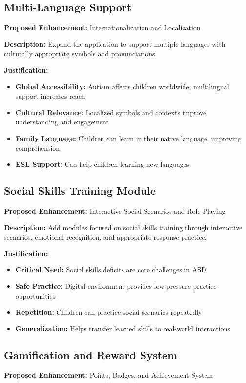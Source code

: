 \documentclass[12pt,a4paper]{article}
\begin{document}
\subsection{Multi-Language Support}
\textbf{Proposed Enhancement:} Internationalization and Localization

\textbf{Description:}
Expand the application to support multiple languages with culturally appropriate symbols and pronunciations.

\textbf{Justification:}
\begin{itemize}
    \item \textbf{Global Accessibility:} Autism affects children worldwide; multilingual support increases reach
    \item \textbf{Cultural Relevance:} Localized symbols and contexts improve understanding and engagement
    \item \textbf{Family Language:} Children can learn in their native language, improving comprehension
    \item \textbf{ESL Support:} Can help children learning new languages
\end{itemize}

\subsection{Social Skills Training Module}
\textbf{Proposed Enhancement:} Interactive Social Scenarios and Role-Playing

\textbf{Description:}
Add modules focused on social skills training through interactive scenarios, emotional recognition, and appropriate response practice.

\textbf{Justification:}
\begin{itemize}
    \item \textbf{Critical Need:} Social skills deficits are core challenges in ASD
    \item \textbf{Safe Practice:} Digital environment provides low-pressure practice opportunities
    \item \textbf{Repetition:} Children can practice social scenarios repeatedly
    \item \textbf{Generalization:} Helps transfer learned skills to real-world interactions
\end{itemize}

\subsection{Gamification and Reward System}
\textbf{Proposed Enhancement:} Points, Badges, and Achievement System
\end{document}

